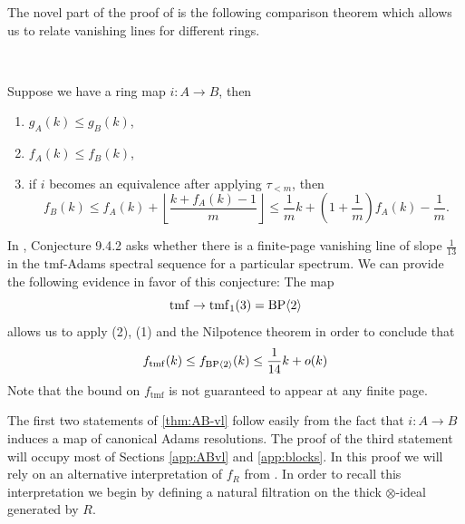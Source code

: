 The novel part of the proof of  is the following comparison theorem which allows us to relate vanishing lines for different rings.

\begin{thm}
  \label{thm:AB-vl}\
  
  Suppose we have a ring map $i : A \to B$, then
  \begin{enumerate}
  \item $g_A(k) \leq g_B(k)$,
  \item $f_A(k) \leq f_B(k)$,
  \item if $i$ becomes an equivalence after applying $\tau_{<m}$, then
    $$ f_B(k) \leq f_A(k) + \left\lfloor \frac{k + f_A(k) - 1}{m} \right\rfloor \leq \frac{1}{m}k + \left( 1 + \frac{1}{m} \right) f_A(k) - \frac{1}{m}. $$
  \end{enumerate}
\end{thm}

\begin{rmk}
  In \cite{BBBCX2}, Conjecture 9.4.2 asks whether there is a finite-page vanishing line of slope $\frac{1}{13}$ in the $\mathrm{tmf}$-Adams spectral sequence for a particular spectrum. We can provide the following evidence in favor of this conjecture:
  The map
  $$ \mathrm{tmf} \to \mathrm{tmf}_1(3) = \mathrm{BP}\langle 2 \rangle $$
  allows us to apply (2), (1) and the Nilpotence theorem in order to conclude that
  $$ f_{\mathrm{tmf}}(k) \leq f_{\mathrm{BP}\langle 2 \rangle}(k) \leq \frac{1}{14}k + o(k) $$ 
  Note that the bound on $f_{\mathrm{tmf}}$ is not guaranteed to appear at any finite page. 
\end{rmk}

The first two statements of \ref{thm:AB-vl} follow easily from the fact that $i:A \to B$ induces a map of canonical Adams resolutions. The proof of the third statement will occupy most of Sections \ref{app:ABvl} and \ref{app:blocks}. In this proof we will rely on an alternative interpretation of $f_R$ from \cite{Akhil}. In order to recall this interpretation we begin by defining a natural filtration on the thick $\otimes$-ideal generated by $R$.

